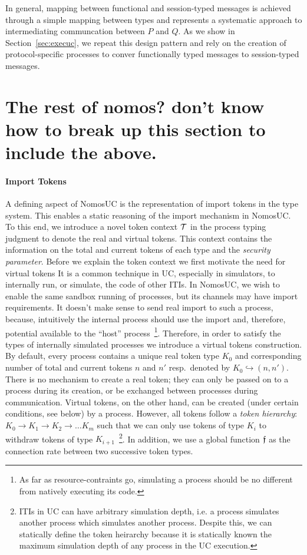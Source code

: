 In general, mapping between functional and session-typed messages is achieved through a simple mapping between types and represents a systematic approach to intermediating communcation between $P$ and $Q$.
As we show in Section~\ref{sec:execuc}, we repeat this design pattern and rely on the creation of protocol-specific processes to conver functionally typed messages to session-typed messages.

\section{The rest of nomos? don't know how to break up this section to include the above.}
\paragraph*{\textbf{Import Tokens}}
A defining aspect of NomosUC is the representation of import tokens in the type system.
This enables a static reasoning of the import mechanism in NomosUC.
To this end, we introduce a novel token context $\mathcal{T}$
in the process typing judgment to denote the real and virtual tokens.
This context contains the information on the total and current tokens
of each type and the \emph{security parameter}.
Before we explain the token context we first motivate the need for virtual tokens
It is a common technique in UC, especially in simulators, to internally run, or simulate, 
the code of other ITIs. In NomosUC, we wish to enable the same sandbox running of processes,
but its channels may have import requirements. It doesn't make sense to
send real import to such a process, because, intuitively the internal process should use the
import and, therefore, potential available to the ``host'' process~\footnote{As far as resource-contraints go, simulating a process should be no different from natively executing its code.}. Therefore, in 
order to satisfy the types of internally simulated processes we introduce a virtual 
tokens construction. 
By default, every process contains a unique real token type $K_0$
and corresponding number of total and current tokens $n$ and $n'$ resp.\
denoted by $K_0 \hookrightarrow (n, n')$.
There is no mechanism to create a real token; they can only be passed on to
a process during its creation, or be exchanged between processes during communication.
Virtual tokens, on the other hand, can be created (under certain conditions,
see below) by a process.
However, all tokens follow a \emph{token hierarchy}: $K_0 \to K_1 \to K_2 \to \ldots K_m$
such that we can only use tokens of type $K_i$ to withdraw tokens of type
$K_{i+1}$~\footnote{ITIs in UC can have arbitrary simulation depth, i.e. a process simulates another process which simulates another process. Despite this, we can statically define the token heirarchy because it is statically known the maximum simulation depth of any process in the UC execution.}.
In addition, we use a global function $\mathfrak{f}$ as the connection
rate between two successive token types.

